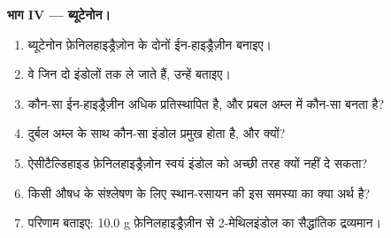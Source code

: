 \begin{problem}
\medskip\noindent\textbf{भाग IV --- ब्यूटेनोन।}
\begin{enumerate}[resume]
  \item ब्यूटेनोन फ़ेनिलहाइड्रैज़ोन के दोनों ईन-हाइड्रैज़ीन बनाइए।
  \item वे जिन दो इंडोलों तक ले जाते हैं, उन्हें बताइए।
  \item कौन-सा ईन-हाइड्रैज़ीन अधिक प्रतिस्थापित है, और प्रबल अम्ल में कौन-सा बनता है?
  \item दुर्बल अम्ल के साथ कौन-सा इंडोल प्रमुख होता है, और क्यों?
  \item ऐसीटैल्डिहाइड फ़ेनिलहाइड्रैज़ोन स्वयं इंडोल को अच्छी तरह क्यों नहीं दे सकता?
  \item किसी औषध के संश्लेषण के लिए स्थान-रसायन की इस समस्या का क्या अर्थ है?
  \item परिणाम बताइए: 10.0 g
        फ़ेनिलहाइड्रैज़ीन से 2-मेथिलइंडोल का सैद्धांतिक द्रव्यमान।
\end{enumerate}
\end{problem}
